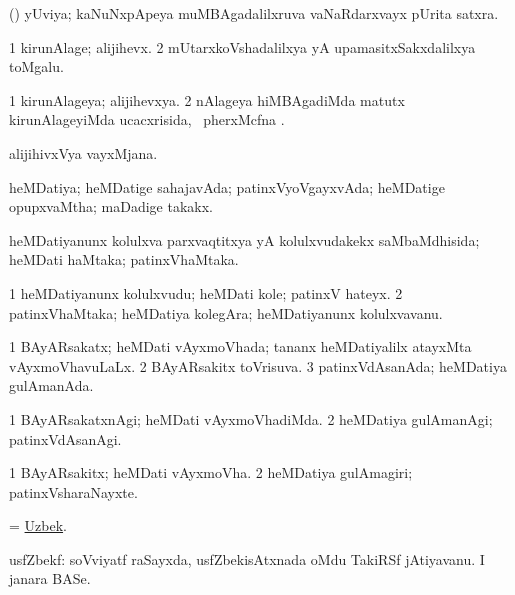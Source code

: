 \bentry
{} 
\gl{\nA}
\expl{}
\bmng
(\aMrashA) yUviya; kaNuNxpApeya muMBAgadalilxruva vaNaRdarxvayx pUrita satxra. 
\emng
\eentry

\bentry
{} 
\gl{\nA}
\bmng
\bnum
\num{1} kirunAlage; alijihevx. 
\num{2} mUtarxkoVshadalilxya yA upamasitxSakxdalilxya toMgalu. 
\enum
\emng
\eentry

\bentry
{} 
\gl{\gu}
\expl{}
\bmng
\bnum
\num{1} kirunAlageya; alijihevxya. 
\num{2} nAlageya hiMBAgadiMda matutx kirunAlageyiMda ucacxrisida, \udA\ pherxMcfna . 
\enum
\emng
\eentry

\bentry
{} 
\gl{\nA}
\expl{}
\bmng
alijihivxVya vayxMjana. 
\emng
\eentry

\bentry
{} 
\gl{\gu}
\expl{}
\bmng
heMDatiya; heMDatige sahajavAda; patinxVyoVgayxvAda; heMDatige opupxvaMtha; maDadige takakx. 
\emng
\eentry

\bentry
{} 
\gl{\gu}
\expl{}
\bmng
heMDatiyanunx kolulxva parxvaqtitxya yA kolulxvudakekx saMbaMdhisida; heMDati haMtaka; patinxVhaMtaka. 
\emng
\eentry

\bentry
{} 
\gl{\nA}
\expl{}
\bmng
\bnum
\num{1} heMDatiyanunx kolulxvudu; heMDati kole; patinxV hateyx. 
\num{2} patinxVhaMtaka; heMDatiya kolegAra; heMDatiyanunx kolulxvavanu. 
\enum
\emng
\eentry

\bentry
{}
\gl{\gu}
\bmng
\bnum
\num{1} BAyARsakatx; heMDati vAyxmoVhada; tananx heMDatiyalilx atayxMta vAyxmoVhavuLaLx. 
\num{2} BAyARsakitx toVrisuva. 
\num{3} patinxVdAsanAda; heMDatiya gulAmanAda. 
\enum
\emng
\eentry

\bentry
{}
\gl{\kirxvi}
\bmng
\bnum
\num{1} BAyARsakatxnAgi; heMDati vAyxmoVhadiMda. 
\num{2} heMDatiya gulAmanAgi; patinxVdAsanAgi. 
\enum
\emng
\eentry

\bentry
{}
\gl{\nA}
\bmng
\bnum
\num{1} BAyARsakitx; heMDati vAyxmoVha. 
\num{2} heMDatiya gulAmagiri; patinxVsharaNayxte. 
\enum
\emng
\eentry

\bentry
{}
\gl{\nA}
\bmng
= \hyperlink{Uzbek}{Uzbek}. 
\emng
\eentry

\bentry
{}
\gl{\nA}
\bmng
usfZbekf: 
\banum
{} soVviyatf raSayxda, usfZbekisAtxnada oMdu TakiRSf jAtiyavanu. 
 I janara BASe. 
\eanum
\emng
\eentry


%
